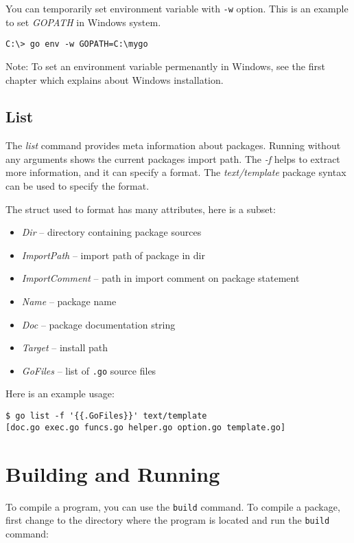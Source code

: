 You can temporarily set environment variable with \texttt{-w} option. This is an
example to set \textit{GOPATH} in Windows system.

\begin{lstlisting}[numbers=none]
C:\> go env -w GOPATH=C:\mygo
\end{lstlisting}

Note: To set an environment variable permenantly in Windows, see the first
chapter which explains about Windows installation.

\subsection{List}

The \textit{list} command provides meta information about packages.
Running without any arguments shows the current packages import path.
The \textit{-f} helps to extract more information, and it can specify
a format.  The \textit{text/template} package syntax can be used to
specify the format.

The struct used to format has many attributes, here is a subset:

\begin{itemize}
\item \textit{Dir} -- directory containing package sources
\item \textit{ImportPath} -- import path of package in dir
\item \textit{ImportComment} -- path in import comment on package statement
\item \textit{Name} -- package name
\item \textit{Doc} -- package documentation string
\item \textit{Target} -- install path
\item \textit{GoFiles} -- list of \texttt{.go} source files
\end{itemize}

Here is an example usage:

\begin{lstlisting}[numbers=none]
$ go list -f '{{.GoFiles}}' text/template
[doc.go exec.go funcs.go helper.go option.go template.go]
\end{lstlisting}

\section{Building and Running}

To compile a program, you can use the \texttt{build}
command.  To compile a package, first change to the
directory where the program is located and run the \texttt{build}
command:

